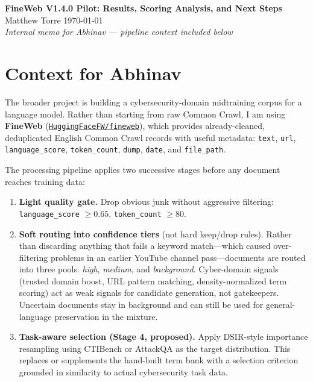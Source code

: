 \documentclass[11pt]{article}
\begin{document}
\begin{center}
    {\Large \textbf{FineWeb V1.4.0 Pilot: Results, Scoring Analysis, and Next Steps}}\\[6pt]
    {\normalsize Matthew Torre \quad\textbullet\quad \today}\\[2pt]
    {\small \textit{Internal memo for Abhinav --- pipeline context included below}}
\end{center}

\section{Context for Abhinav}

The broader project is building a cybersecurity-domain midtraining corpus for a language model.
Rather than starting from raw Common Crawl, I am using \textbf{FineWeb}
(\href{https://huggingface.co/datasets/HuggingFaceFW/fineweb}{\texttt{HuggingFaceFW/fineweb}}),
which provides already-cleaned, deduplicated English Common Crawl records with useful metadata:
\texttt{text}, \texttt{url}, \texttt{language\_score}, \texttt{token\_count}, \texttt{dump}, \texttt{date}, and \texttt{file\_path}.

The processing pipeline applies two successive stages before any document reaches training data:

\begin{enumerate}[leftmargin=1.5em]
    \item \textbf{Light quality gate.}
          Drop obvious junk without aggressive filtering:
          \texttt{language\_score} $\geq 0.65$, \texttt{token\_count} $\geq 80$.

    \item \textbf{Soft routing into confidence tiers} (not hard keep/drop rules).
          Rather than discarding anything that fails a keyword match---which caused
          over-filtering problems in an earlier YouTube channel pass---documents are
          routed into three pools: \textit{high}, \textit{medium}, and
          \textit{background}. Cyber-domain signals (trusted domain boost, URL
          pattern matching, density-normalized term scoring) act as weak signals for
          candidate generation, not gatekeepers. Uncertain documents stay in
          background and can still be used for general-language preservation in the
          mixture.

    \item \textbf{Task-aware selection (Stage 4, proposed).}
          Apply DSIR-style importance resampling
          \cite{xie2023data}
          using CTIBench \cite{tihanyi2024ctibench} or AttackQA as the target
          distribution. This replaces or supplements the hand-built term bank with
          a selection criterion grounded in similarity to actual cybersecurity task
          data.
\end{enumerate}
\end{document}
